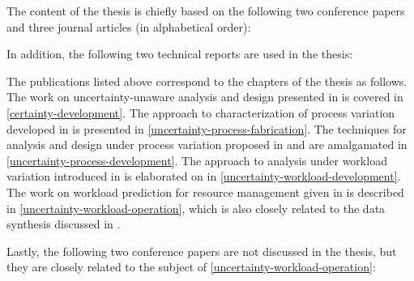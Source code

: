 The content of the thesis is chiefly based on the following two conference
papers and three journal articles (in alphabetical order):

\printbibliography[heading=none,keyword=own]

In addition, the following two technical reports are used in the thesis:

\printbibliography[heading=none,keyword=own-unpublished]

The publications listed above correspond to the chapters of the thesis as
follows. The work on uncertainty-unaware analysis and design presented in
\cite{ukhov2012} is covered in \cref{certainty-development}. The approach to
characterization of process variation developed in \cite{ukhov2014a} is
presented in \cref{uncertainty-process-fabrication}. The techniques for analysis
and design under process variation proposed in \cite{ukhov2014b} and
\cite{ukhov2015} are amalgamated in \cref{uncertainty-process-development}. The
approach to analysis under workload variation introduced in \cite{ukhov2017a} is
elaborated on in \cref{uncertainty-workload-development}. The work on workload
prediction for resource management given in \cite{ukhov2017b} is described in
\cref{uncertainty-workload-operation}, which is also closely related to the data
synthesis discussed in \cite{ukhov2017c}.

\nocite{niknafs2017a, niknafs2017b}
Lastly, the following two conference papers are not discussed in the thesis, but
they are closely related to the subject of
\cref{uncertainty-workload-operation}:

\printbibliography[heading=none,keyword=own-secondary]
